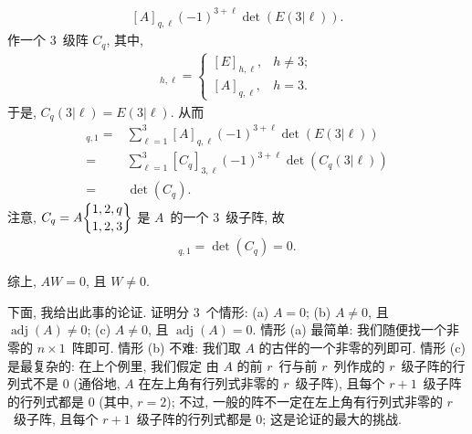 \documentclass[../libro.tex]{subfiles}
\begin{document}
\begin{example}
\begin{align*}
        {[A]_{q,\ell}
        (-1)^{3+\ell} \det {(E(3|\ell))}}.
    \end{align*}
    作一个 \(3\)~级阵 \(C_q\), 其中,
    \begin{align*}
        [C_q]_{h,\ell} =
        \begin{cases}
            [E]_{h,\ell}, & h \neq 3; \\
            [A]_{q,\ell}, & h = 3.
        \end{cases}
    \end{align*}
    于是, \(C_q(3|\ell) = E(3|\ell)\).
    从而
    \begin{align*}
        [AW]_{q,1}
        = {} &
        \sum_{\ell=1}^{3}
        {[A]_{q,\ell}
        (-1)^{3+\ell} \det {(E(3|\ell))}}
        \\
        = {} &
        \sum_{\ell=1}^{3}
        {[C_q]_{3,\ell}
        (-1)^{3+\ell} \det {(C_q (3|\ell))}}
        \\
        = {} &
        \det {(C_q)}.
    \end{align*}
    注意,
    \(C_q = A\submat{1,2,q}{1,2,3}\)
    是 \(A\)~的一个 \(3\)~级子阵,
    故
    \begin{align*}
        [AW]_{q,1} = \det {(C_q)} = 0.
    \end{align*}

    综上, \(AW = 0\), 且 \(W \neq 0\).
\end{example}

下面, 我给出此事的论证.
证明分 \(3\)~个情形:
(a)
\(A = 0\);
(b)
\(A \neq 0\), 且
\(\operatorname{adj} {(A)} \neq 0\);
(c)
\(A \neq 0\), 且
\(\operatorname{adj} {(A)} = 0\).
情形 (a) 最简单:
我们随便找一个非零的 \(n \times 1\)~阵即可.
情形 (b) 不难:
我们取 \(A\) 的古伴的一个非零的列即可.
情形 (c) 是最复杂的:
在上个例里, 我们假定%
由 \(A\) 的前 \(r\)~行与前 \(r\)~列作成的
\(r\)~级子阵的行列式不是 \(0\)
(通俗地, \(A\) 在左上角有行列式非零的 \(r\)~级子阵),
且每个 \(r+1\)~级子阵的行列式都是 \(0\)
(其中, \(r = 2\));
不过, 一般的阵不一定在左上角有行列式非零的 \(r\)~级子阵,
且每个 \(r+1\)~级子阵的行列式都是 \(0\);
这是论证的最大的挑战.
\end{document}
